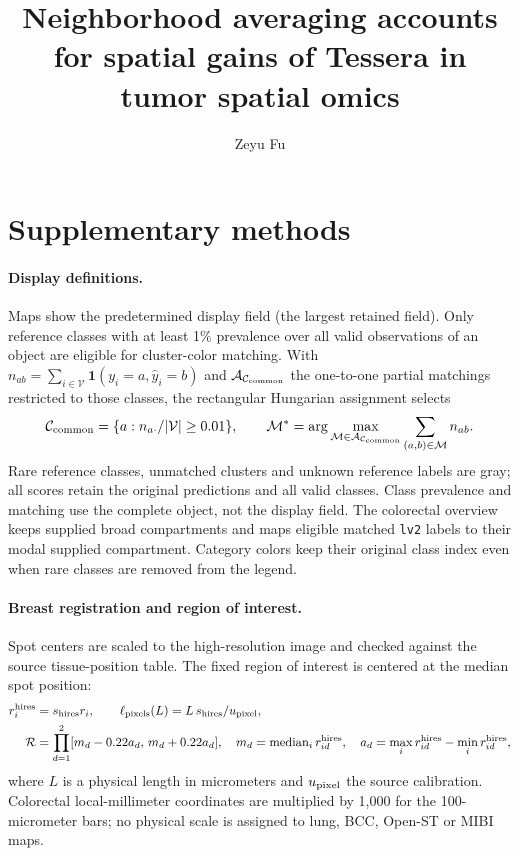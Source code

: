 \documentclass[11pt]{article}
\title{Neighborhood averaging accounts for spatial gains of Tessera in tumor spatial omics}
\author{Zeyu Fu}\date{}
\renewcommand{\thefigure}{S\arabic{figure}}
\begin{document}
\renewcommand{\thefigure}{S\arabic{figure}}
\raggedbottom\maketitle
\modulolinenumbers[5]\linenumbers
\section*{Supplementary methods}
\paragraph{Display definitions.} Maps show the predetermined display field (the largest retained field). Only reference classes with at least 1\% prevalence over all valid observations of an object are eligible for cluster-color matching. With \(n_{ab}=\sum_{i\in\mathcal V}\mathbf1(y_i=a,\widehat y_i=b)\) and \(\mathcal A_{\mathcal C_{\rm common}}\) the one-to-one partial matchings restricted to those classes, the rectangular Hungarian assignment selects
\begin{equation}
\mathcal C_{\rm common}=\{a:n_{a\cdot}/|\mathcal V|\geq0.01\},\qquad
\mathcal M^*=\arg\max_{\mathcal M\in\mathcal A_{\mathcal C_{\rm common}}}\sum_{(a,b)\in\mathcal M}n_{ab}.\label{eq:display-match}
\end{equation}
Rare reference classes, unmatched clusters and unknown reference labels are gray; all scores retain the original predictions and all valid classes. Class prevalence and matching use the complete object, not the display field. The colorectal overview keeps supplied broad compartments and maps eligible matched \texttt{lv2} labels to their modal supplied compartment. Category colors keep their original class index even when rare classes are removed from the legend.

\paragraph{Breast registration and region of interest.} Spot centers are scaled to the high-resolution image and checked against the source tissue-position table. The fixed region of interest is centered at the median spot position:
\begin{equation}\begin{aligned}
r_i^{\rm hires}&=s_{\rm hires}r_i,\qquad
\ell_{\rm pixels}(L)=L\,s_{\rm hires}/u_{\rm pixel},\\
\mathcal R&=\prod_{d=1}^2[m_d-0.22a_d,\,m_d+0.22a_d],\quad
m_d=\operatorname{median}_i r_{id}^{\rm hires},\quad
a_d=\max_i r_{id}^{\rm hires}-\min_i r_{id}^{\rm hires},
\end{aligned}\label{eq:registration}\end{equation}
where \(L\) is a physical length in micrometers and \(u_{\rm pixel}\) the source calibration. Colorectal local-millimeter coordinates are multiplied by 1,000 for the 100-micrometer bars; no physical scale is assigned to lung, BCC, Open-ST or MIBI maps.
\end{document}
